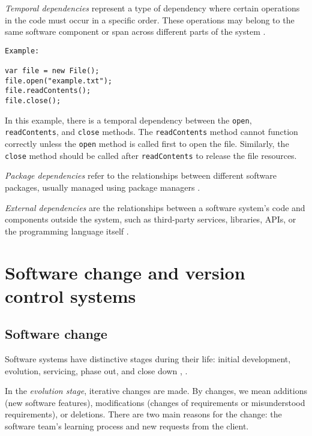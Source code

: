 \textit{Temporal dependencies} represent a type of dependency where certain operations in the code must occur in a specific order. These operations may belong to the same software component or span across different parts of the system \cite{Cataldo2009SoftwareDW}.

\begin{verbatim}
Example:

var file = new File();
file.open("example.txt");
file.readContents();
file.close();
\end{verbatim}

In this example, there is a temporal dependency between the \texttt{open}, \texttt{readContents}, and \texttt{close} methods. The \texttt{readContents} method cannot function correctly unless the \texttt{open} method is called first to open the file. Similarly, the \texttt{close} method should be called after \texttt{readContents} to release the file resources.


\textit{Package dependencies} refer to the relationships between different software packages, usually managed using package managers \cite{dep-package}.

\textit{External dependencies} are the relationships between a software system's code and components outside the system, such as third-party services, libraries, APIs, or the programming language itself \cite{dep-external}.






\section{Software change and version control systems}

\subsection{Software change}
\label{change}

\hspace{4em}Software systems have distinctive stages during their life: initial development, evolution, servicing, phase out, and close down \cite{Software-life-cycle}, \cite{model-bennett}.

In the \textit{evolution stage}, iterative changes are made. By changes, we mean additions (new software features), modifications (changes of requirements or misunderstood requirements), or deletions. There are two main reasons for the change: the software team's learning process and new requests from the client.

